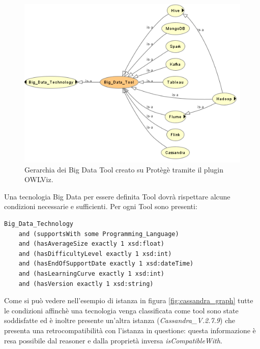 \begin{figure}[H]
    \centering
    \includegraphics[width=12cm]{docs/images/bdtoolowlviz.png}
    \caption{Gerarchia dei Big Data Tool creato su Protègè tramite il plugin OWLViz.}
    \label{fig:bdtool_graph}
\end{figure}

Una tecnologia Big Data per essere definita Tool dovrà rispettare alcune condizioni necessarie e sufficienti. Per ogni Tool sono presenti:
\begin{verbatim}
Big_Data_Technology
    and (supportsWith some Programming_Language)
    and (hasAverageSize exactly 1 xsd:float)
    and (hasDifficultyLevel exactly 1 xsd:int)
    and (hasEndOfSupportDate exactly 1 xsd:dateTime)
    and (hasLearningCurve exactly 1 xsd:int)
    and (hasVersion exactly 1 xsd:string)
\end{verbatim}

\newpage

Come si può vedere nell'esempio di istanza in figura \ref{fig:cassandra_graph} tutte le condizioni affinchè una tecnologia venga classificata come tool sono state soddisfatte ed è inoltre presente un'altra istanza (\textit{Cassandra\_V.2.7.9}) che presenta una retrocompatibilità con l'istanza in questione: questa informazione è resa possibile dal reasoner e dalla proprietà inversa \textit{isCompatibleWith}.

